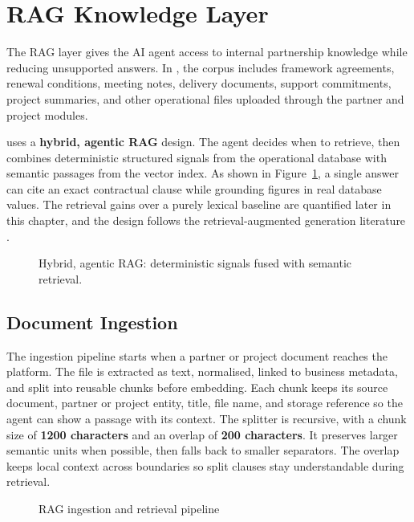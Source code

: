 \section{RAG Knowledge Layer}
\label{sec:chapter7-rag-layer}
The RAG layer gives the AI agent access to internal partnership knowledge while reducing unsupported answers. In \projectname{}, the corpus includes framework agreements, renewal conditions, meeting notes, delivery documents, support commitments, project summaries, and other operational files uploaded through the partner and project modules.

\projectname{} uses a \textbf{hybrid, agentic RAG} design. The agent decides when to retrieve, then combines deterministic structured signals from the operational database with semantic passages from the vector index. As shown in Figure~\ref{fig:hybrid-rag}, a single answer can cite an exact contractual clause while grounding figures in real database values. The retrieval gains over a purely lexical baseline are quantified later in this chapter, and the design follows the retrieval-augmented generation literature .

\begin{figure}[htbp]
  \centering
  \caption{Hybrid, agentic RAG: deterministic signals fused with semantic retrieval.}
  \label{fig:hybrid-rag}
\end{figure}

\subsection{Document Ingestion}
\label{subsec:chapter7-document-ingestion}
The ingestion pipeline starts when a partner or project document reaches the platform. The file is extracted as text, normalised, linked to business metadata, and split into reusable chunks before embedding. Each chunk keeps its source document, partner or project entity, title, file name, and storage reference so the agent can show a passage with its context.
The splitter is recursive, with a chunk size of \textbf{1200 characters} and an overlap of \textbf{200 characters}. It preserves larger semantic units when possible, then falls back to smaller separators. The overlap keeps local context across boundaries so split clauses stay understandable during retrieval.
\begin{figure}[htbp]
  \caption{RAG ingestion and retrieval pipeline}
  \label{fig:chapter7-rag-pipeline}
\end{figure}
